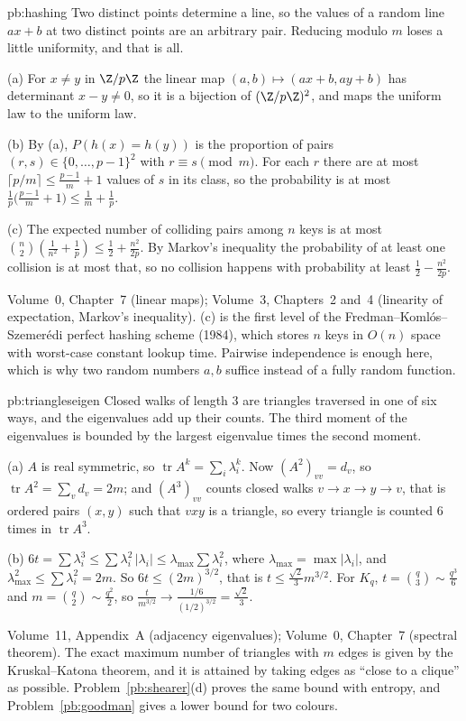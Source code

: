 \begin{solution}{pb:hashing}
\idea Two distinct points determine a line, so the values of a random line $ax+b$ at two distinct points are an arbitrary pair.
Reducing modulo $m$ loses a little uniformity, and that is all.

\writeup (a) For $x\ne y$ in $\Z/p\Z$ the linear map $(a,b)\mapsto(ax+b,ay+b)$ has determinant $x-y\ne0$, so it is a bijection of
$(\Z/p\Z)^2$, and maps the uniform law to the uniform law.

(b) By (a), $P(h(x)=h(y))$ is the proportion of pairs $(r,s)\in\{0,\dots,p-1\}^2$ with $r\equiv s\pmod m$. For each $r$ there are at most
$\lceil p/m\rceil\le\frac{p-1}m+1$ values of $s$ in its class, so the probability is at most $\frac1p\bigl(\frac{p-1}m+1\bigr)\le\frac1m+\frac1p$.

(c) The expected number of colliding pairs among $n$ keys is at most $\binom n2(\frac1{n^2}+\frac1p)\le\frac12+\frac{n^2}{2p}$. By Markov's
inequality the probability of at least one collision is at most that, so no collision happens with probability at least
$\frac12-\frac{n^2}{2p}$.

\tools Volume~0, Chapter~7 (linear maps); Volume~3, Chapters~2 and~4 (linearity of expectation, Markov's inequality).
\leads (c) is the first level of the Fredman--Komlós--Szemerédi perfect hashing scheme (1984), which stores $n$ keys in $O(n)$ space
with worst-case constant lookup time. Pairwise independence is enough here, which is why two random numbers $a,b$ suffice instead
of a fully random function.
\end{solution}

\begin{solution}{pb:triangleseigen}
\idea Closed walks of length $3$ are triangles traversed in one of six ways, and the eigenvalues add up their counts. The third
moment of the eigenvalues is bounded by the largest eigenvalue times the second moment.

\writeup (a) $A$ is real symmetric, so $\operatorname{tr}A^k=\sum_i\lambda_i^k$. Now $(A^2)_{vv}=d_v$, so $\operatorname{tr}A^2=\sum_vd_v=2m$; and $(A^3)_{vv}$ counts closed
walks $v\to x\to y\to v$, that is ordered pairs $(x,y)$ such that $vxy$ is a triangle, so every triangle is counted $6$ times in
$\operatorname{tr}A^3$.

(b) $6t=\sum\lambda_i^3\le\sum\lambda_i^2\,|\lambda_i|\le\lambda_{\max}\sum\lambda_i^2$, where $\lambda_{\max}=\max|\lambda_i|$, and
$\lambda_{\max}^2\le\sum\lambda_i^2=2m$. So $6t\le(2m)^{3/2}$, that is $t\le\frac{\sqrt2}3m^{3/2}$. For $K_q$, $t=\binom q3\sim\frac{q^3}6$ and
$m=\binom q2\sim\frac{q^2}2$, so $\frac t{m^{3/2}}\to\frac{1/6}{(1/2)^{3/2}}=\frac{\sqrt2}3$.

\tools Volume~11, Appendix~A (adjacency eigenvalues); Volume~0, Chapter~7 (spectral theorem).
\leads The exact maximum number of triangles with $m$ edges is given by the Kruskal--Katona theorem, and it is attained by
taking edges as ``close to a clique'' as possible. Problem~\ref{pb:shearer}(d) proves the same bound with entropy, and
Problem~\ref{pb:goodman} gives a lower bound for two colours.
\end{solution}

